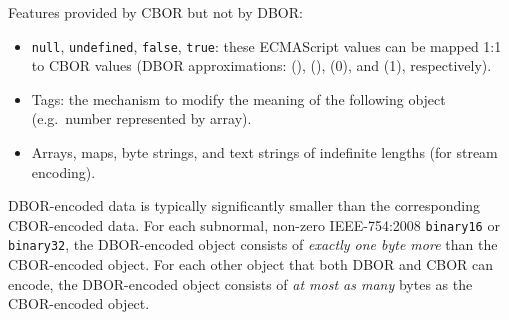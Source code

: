 \begin{BeginParPenalty}
    Features provided by CBOR but not by DBOR:
    \begin{itemize}
        \item
        \texttt{null}, \texttt{undefined}, \texttt{false}, \texttt{true}:
        these ECMAScript values can be mapped 1:1 to CBOR values
        (DBOR approximations: \DborNoneValue(), \DborNoneValue(), \DborIntegerValue(0), and \DborIntegerValue(1),
        respectively).

        \item Tags:
        the mechanism to modify the meaning of the following object
        (e.g.\ number represented by array).

        \item
        Arrays, maps, byte strings, and text strings of indefinite lengths (for stream encoding).
    \end{itemize}
\end{BeginParPenalty}

DBOR-encoded data is typically significantly smaller than the corresponding CBOR-encoded data.
For each subnormal, non-zero IEEE-754:2008 \texttt{binary16} or \texttt{binary32}, the DBOR-encoded object consists of
\emph{exactly one byte more} than the CBOR-encoded object.
For each other object that both DBOR and CBOR can encode, the DBOR-encoded object consists of \emph{at most as many}
bytes as the CBOR-encoded object.

